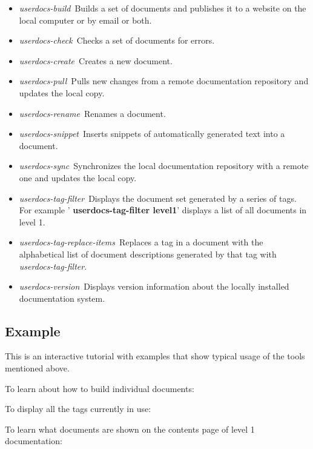 \documentclass[12pt]{article}
\begin{document}
\begin{itemize}
\item {\it userdocs-build}\,\,\,Builds a set of documents and
  publishes it to a website on the local computer or by email or both.
\item {\it userdocs-check}\,\,\,Checks a set of documents for errors.
\item {\it userdocs-create}\,\,\,Creates a new document.
\item {\it userdocs-pull}\,\,\,Pulls new changes from a remote
  documentation repository and updates the local copy.
\item {\it userdocs-rename}\,\,\,Renames a document.
\item {\it userdocs-snippet}\,\,\,Inserts snippets of automatically
  generated text into a document.
\item {\it userdocs-sync}\,\,\,Synchronizes the local documentation
  repository with a remote one and updates the local copy.
\item {\it userdocs-tag-filter}\,\,\,Displays the document set
  generated by a series of tags.  For example '{\bf
    userdocs-tag-filter level1}' displays a list of all documents in
  level 1.
\item {\it userdocs-tag-replace-items}\,\,\,Replaces a tag in a
  document with the alphabetical list of document descriptions
  generated by that tag with {\it userdocs-tag-filter}.
\item {\it userdocs-version}\,\,\,Displays version information about
  the locally installed documentation system.
\end{itemize}


\subsection*{Example}

This is an interactive tutorial with examples that show typical usage
of the tools mentioned above.

To learn about how to build individual documents:


To display all the tags currently in use:


To learn what documents are shown on the contents page of level 1
documentation:
\end{document}
